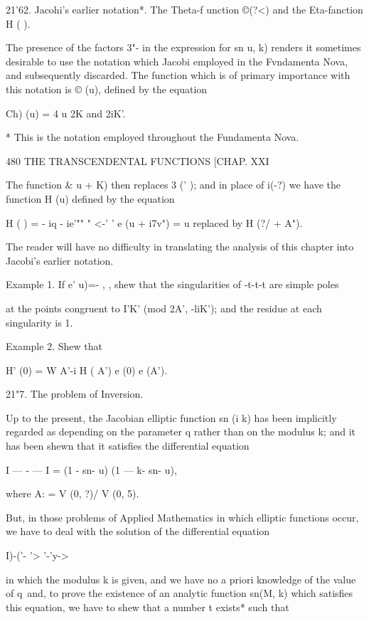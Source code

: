 21'62. Jacohi's earlier notation*. The Theta-f unction ©(?<) and the
Eta-fanction H ( ).

The presence of the factors 3"- in the expression for sn u, k) renders
it sometimes desirable to use the notation which Jacobi employed in
the Fvndamenta Nova, and subsequently discarded. The function which is
of primary importance with this notation is © (u), defined by the
equation

Ch) (u) = 4 u%
2K and 2iK'.

* This is the notation employed throughout the Fundamenta Nova.

480 THE TRANSCENDENTAL FUNCTIONS [CHAP. XXI

The function \& u + K) then replaces 3 (' ); and in place of i(-?) we
have the function H (u) defined by the equation

H ( ) = - iq - ie'"" " <-' ' e (u + i7v") = u%
replaced by H (?/ + A").

The reader will have no difficulty in translating the analysis of this
chapter into Jacobi's earlier notation.

Example 1. If e' u)=- , , shew that the singularities of -t-t-t are
simple poles

at the points congruent to I'K' (mod 2A', -liK'); and the residue at
each singularity is 1.

Example 2. Shew that

H' (0) = W A'-i H ( A') e (0) e (A').

21"7. The problem of Inversion.

Up to the present, the Jacobian elliptic function sn (i k) has been
implicitly regarded as depending on the parameter q rather than on the
modulus k; and it has been shewn that it satisfies the differential
equation

I — - — I = (1 - sn- u) (1 — k- sn- u),

where A: = V (0, ?)/ V (0, 5).

But, in those problems of Applied Mathematics in which elliptic
functions occur, we have to deal with the solution of the differential
equation

 I)-('- '> '-'y->

in which the modulus k is given, and we have no a priori knowledge of
the value of q\ and, to prove the existence of an analytic function
sn(M, k) which satisfies this equation, we have to shew that a number
t exists* such that

